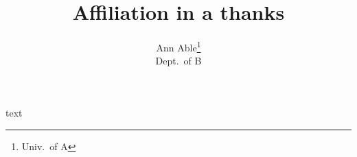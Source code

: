\documentclass{article}
\begin{document}
\title{Affiliation in a thanks}
\author{Ann Able\thanks{Univ.\ of A} \\ Dept.\ of B}
\date{}
\maketitle
text
\end{document}
